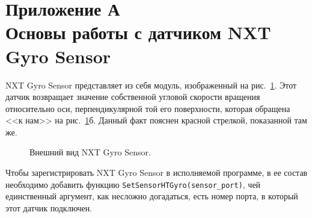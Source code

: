 \newpage
\section{Приложение А\\
Основы работы с датчиком NXT Gyro Sensor}
\hspace*{\parindent}NXT Gyro Sensor представляет из себя модуль, изображенный на рис.~\ref{sensor}. 
Этот датчик возвращает значение собственной угловой скорости вращения относительно оси, перпендикулярной той его поверхности, которая обращена <<к нам>> на рис.~\ref{sensor}б.
Данный факт пояснен красной стрелкой, показанной там же.

\begin{figure}[h]
	\begin{minipage}[h]{0.49\linewidth}
	\end{minipage}
	\hfill
	\begin{minipage}[h]{0.49\linewidth}
	\end{minipage}
	\caption{Внешний вид NXT Gyro Sensor.}
	\label{sensor}
\end{figure}

Чтобы зарегистрировать NXT Gyro Sensor в исполняемой программе, в ее состав необходимо добавить функцию \verb|SetSensorHTGyro(sensor_port)|, чей единственный аргумент, как несложно догадаться, есть номер порта, в который этот датчик подключен.

